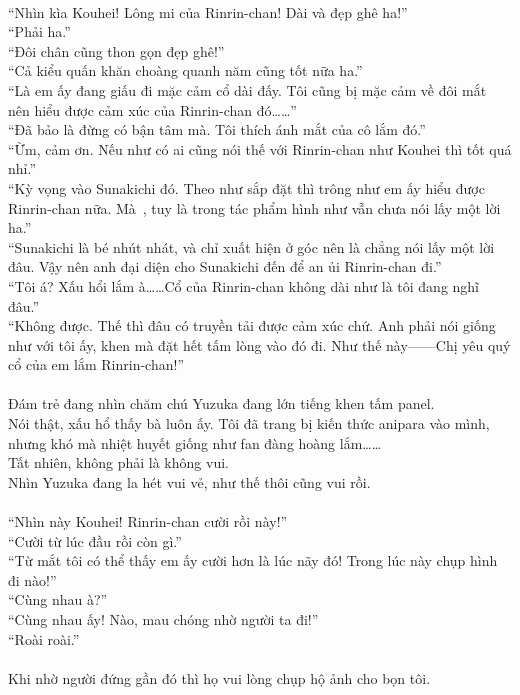 \documentclass[12pt,a4paper, twosides]{book}
\begin{document}
\\
“Nhìn kìa Kouhei! Lông mi của Rinrin-chan! Dài và đẹp ghê ha!”\\
“Phải ha.”\\
“Đôi chân cũng thon gọn đẹp ghê!”\\
“Cả kiểu quấn khăn choàng quanh năm cũng tốt nữa ha.”\\
“Là em ấy đang giấu đi mặc cảm cổ dài đấy. Tôi cũng bị mặc cảm về đôi mắt nên hiểu được cảm xúc của Rinrin-chan đó……”\\
“Đã bảo là đừng có bận tâm mà. Tôi thích ánh mắt của cô lắm đó.”\\
“Ừm, cảm ơn. Nếu như có ai cũng nói thế với Rinrin-chan như Kouhei thì tốt quá nhỉ.”\\
“Kỳ vọng vào Sunakichi đó. Theo như sắp đặt thì trông như em ấy hiểu được Rinrin-chan nữa. Mà~, tuy là trong tác phẩm hình như vẫn chưa nói lấy một lời ha.”\\
“Sunakichi là bé nhút nhát, và chỉ xuất hiện ở góc nên là chẳng nói lấy một lời đâu. Vậy nên anh đại diện cho Sunakichi đến để an ủi Rinrin-chan đi.”\\
“Tôi á? Xấu hổi lắm à……Cổ của Rinrin-chan không dài như là tôi đang nghĩ đâu.”\\
“Không được. Thế thì đâu có truyền tải được cảm xúc chứ. Anh phải nói giống như với tôi ấy, khen mà đặt hết tấm lòng vào đó đi. Như thế này——Chị yêu quý cổ của em lắm Rinrin-chan!”\\
\\
Đám trẻ đang nhìn chăm chú Yuzuka đang lớn tiếng khen tấm panel.\\
Nói thật, xấu hổ thấy bà luôn ấy. Tôi đã trang bị kiến thức anipara vào mình, nhưng khó mà nhiệt huyết giống như fan đàng hoàng lắm……\\
Tất nhiên, không phải là không vui.\\
Nhìn Yuzuka đang la hét vui vẻ, như thế thôi cũng vui rồi.\\
\\
“Nhìn này Kouhei! Rinrin-chan cười rồi này!”\\
“Cười từ lúc đầu rồi còn gì.”\\
“Từ mắt tôi có thể thấy em ấy cười hơn là lúc nãy đó! Trong lúc này chụp hình đi nào!”\\
“Cùng nhau à?”\\
“Cùng nhau ấy! Nào, mau chóng nhờ người ta đi!”\\
“Roài roài.”\\
\\
Khi nhờ người đứng gần đó thì họ vui lòng chụp hộ ảnh cho bọn tôi.\\
\end{document}
